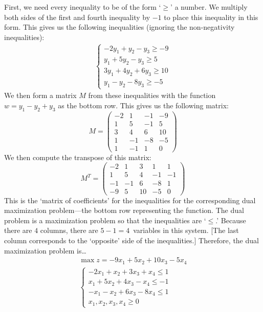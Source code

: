 \documentclass[11pt,letterpaper]{article}
\begin{document}
\sol First, we need every inequality to be of the form `$\geq$' a number. We multiply both sides of the first and fourth inequality by $-1$ to place this inequality in this form. This gives us the following inequalities (ignoring the non-negativity inequalities):
	\[
	\begin{gathered}
	\begin{cases}
	-2y_1 + y_2 - y_3 \geq -9 \\
	y_1 + 5y_2 - y_3 \geq 5 \\
	3y_1 + 4y_2 + 6y_3 \geq 10 \\
	y_1 - y_2 - 8y_3 \geq -5 
	\end{cases}
	\end{gathered}
	\]
We then form a matrix $M$ from these inequalities with the function $w= y_1 - y_2 + y_3$ as the bottom row. This gives us the following matrix: 
	\[
	M=
	\begin{pmatrix}
	-2 & 1 & -1 & -9 \\
	1 & 5 & -1 & 5 \\
	3 & 4 & 6 & 10 \\
	1 & -1 & -8 & -5 \\
	1 & -1 & 1 & 0 
	\end{pmatrix}
	\]
We then compute the transpose of this matrix:
	\[
	M^T= 
	\begin{pmatrix}
	-2 & 1 & 3 & 1 & 1 \\
	1 & 5 & 4 & -1 & -1 \\
	-1 & -1 & 6 & -8 & 1 \\
	-9 & 5 & 10 & -5 & 0 
	\end{pmatrix}
	\]
This is the `matrix of coefficients' for the inequalities for the corresponding dual maximization problem---the bottom row representing the function. The dual problem is a maximization problem so that the inequalities are `$\leq$.' Because there are $4$ columns, there are $5 - 1= 4$~variables in this system. [The last column corresponds to the `opposite' side of the inequalities.] Therefore, the dual maximization problem is\dots
	\[
	\begin{gathered}
	\max z= -9x_1 + 5x_2 + 10x_3 - 5x_4 \\
	\begin{cases}
	-2x_1 + x_2 + 3x_3 + x_4 \leq 1 \\
	x_1 + 5x_2 + 4x_3 - x_4 \leq -1 \\
	-x_1 - x_2 + 6x_3 - 8x_4 \leq 1 \\
	x_1, x_2, x_3, x_4 \geq 0
	\end{cases}
	\end{gathered}
	\] 
\end{document}
